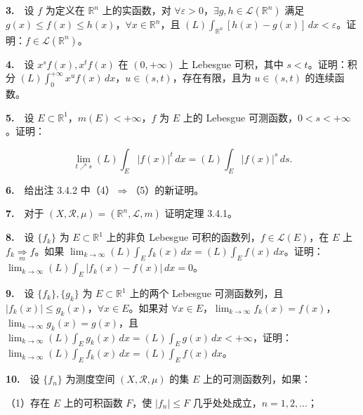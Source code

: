 \documentclass[11pt,a4paper]{article}
\begin{document}
\par{}\noindent \textbf{3.}　设 \(f\) 为定义在 \(\mathbb R^n\) 上的实函数，对 \(\forall\varepsilon>0\)，\(\exists g,h\in\mathcal L(\mathbb R^n)\) 满足 \(g(x)\le f(x)\le h(x)\)，\(\forall x\in\mathbb R^n\)，且 \((L)\int_{\mathbb R^n}[h(x)-g(x)]\,dx<\varepsilon\)。证明：\(f\in\mathcal L(\mathbb R^n)\)。

\par{}\noindent \textbf{4.}　设 \(x^s f(x),x^t f(x)\) 在 \((0,+\infty)\) 上 Lebesgue 可积，其中 \(s<t\)。证明：积分 \((L)\int_0^{+\infty}x^u f(x)\,dx\)，\(u\in(s,t)\)，存在有限，且为 \(u\in(s,t)\) 的连续函数。

\par{}\noindent \textbf{5.}　设 \(E\subset\mathbb R^1\)，\(m(E)<+\infty\)，\(f\) 为 \(E\) 上的 Lebesgue 可测函数，\(0<s<+\infty\)。证明：

\[
\lim_{t\nearrow s}(L)\int_E |f(x)|^t\,dx=(L)\int_E|f(x)|^s\,ds.
\]

\par{}\noindent \textbf{6.}　给出注 3.4.2 中（4）\(\Rightarrow\)（5）的新证明。

\par{}\noindent \textbf{7.}　对于 \((X,\mathcal R,\mu)=(\mathbb R^n,\mathcal L,m)\) 证明定理 3.4.1。

\par{}\noindent \textbf{8.}　设 \(\{f_k\}\) 为 \(E\subset\mathbb R^1\) 上的非负 Lebesgue 可积的函数列，\(f\in\mathcal L(E)\)，在 \(E\) 上 \(f_k\underset{m}{\Rightarrow}f\)。如果 \(\lim_{k\to\infty}(L)\int_E f_k(x)\,dx=(L)\int_E f(x)\,dx\)。证明：\(\lim_{k\to\infty}(L)\int_E|f_k(x)-f(x)|\,dx=0\)。

\par{}\noindent \textbf{9.}　设 \(\{f_k\},\{g_k\}\) 为 \(E\subset\mathbb R^1\) 上的两个 Lebesgue 可测函数列，且 \(|f_k(x)|\le g_k(x)\)，\(\forall x\in E\)。如果对 \(\forall x\in E\)，\(\lim_{k\to\infty}f_k(x)=f(x)\)，\(\lim_{k\to\infty}g_k(x)=g(x)\)，且 \(\lim_{k\to\infty}(L)\int_E g_k(x)\,dx=(L)\int_E g(x)\,dx<+\infty\)，证明：\(\lim_{k\to\infty}(L)\int_E f_k(x)\,dx=(L)\int_E f(x)\,dx\)。

\par{}\noindent \textbf{10.}　设 \(\{f_n\}\) 为测度空间 \((X,\mathcal R,\mu)\) 的集 \(E\) 上的可测函数列，如果：

（1）存在 \(E\) 上的可积函数 \(F\)，使 \(|f_n|\le F\) 几乎处处成立，\(n=1,2,\ldots\)；
\end{document}

